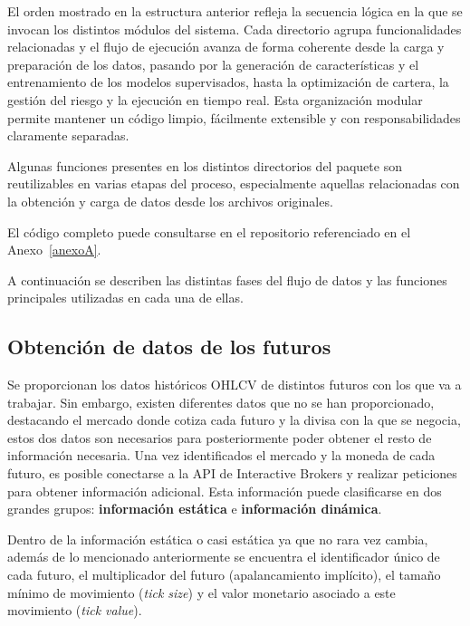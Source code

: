 El orden mostrado en la estructura anterior refleja la secuencia lógica en la que se invocan los distintos módulos del sistema. Cada directorio agrupa
funcionalidades relacionadas y el flujo de ejecución avanza de forma coherente desde la carga y preparación de los datos, pasando por la generación de
características y el entrenamiento de los modelos supervisados, hasta la optimización de cartera, la gestión del riesgo y la ejecución en tiempo real.
Esta organización modular permite mantener un código limpio, fácilmente extensible y con responsabilidades claramente separadas.


Algunas funciones presentes en los distintos directorios del paquete son reutilizables en varias etapas del proceso, especialmente aquellas
relacionadas con la obtención y carga de datos desde los archivos originales.

El código completo puede consultarse en el repositorio referenciado en el Anexo~\ref{anexoA}.

A continuación se describen las distintas fases del flujo de datos y las funciones principales utilizadas en cada una de ellas.

\subsection{Obtención de datos de los futuros}

Se proporcionan los datos históricos OHLCV de distintos futuros con los que va a trabajar. Sin embargo, existen diferentes datos que no se han
proporcionado, destacando el mercado donde cotiza cada futuro y la divisa con la que se negocia, estos dos datos son necesarios para posteriormente
poder obtener el resto de información necesaria. Una vez identificados el mercado y la moneda de cada futuro, es posible conectarse a la API de
Interactive Brokers y realizar peticiones para obtener información adicional. Esta información puede clasificarse en dos grandes grupos:
\textbf{información estática} e \textbf{información dinámica}.

Dentro de la información estática o casi estática ya que no rara vez cambia, además de lo mencionado anteriormente se encuentra el identificador único
de cada futuro, el multiplicador del futuro (apalancamiento implícito), el tamaño mínimo de movimiento (\textit{tick size}) y el valor monetario
asociado a este movimiento (\textit{tick value}).

